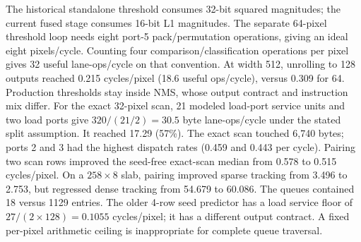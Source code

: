 The historical standalone threshold consumes 32-bit squared magnitudes; the current fused stage consumes 16-bit L1 magnitudes. The separate 64-pixel threshold loop needs eight port-5 pack/permutation operations, giving an ideal eight pixels/cycle. Counting four comparison/classification operations per pixel gives 32 useful lane-ops/cycle on that convention. At width 512, unrolling to 128 outputs reached 0.215 cycles/pixel (18.6 useful ops/cycle), versus 0.309 for 64. Production thresholds stay inside NMS, whose output contract and instruction mix differ.
For the exact 32-pixel scan, 21 modeled load-port service units and two load ports give $320/(21/2)=30.5$ byte lane-ops/cycle under the stated split assumption. It reached 17.29 (57\%). The exact scan touched 6,740 bytes; ports 2 and 3 had the highest dispatch rates (0.459 and 0.443 per cycle). Pairing two scan rows improved the seed-free exact-scan median from 0.578 to 0.515 cycles/pixel. On a $258\times8$ slab, pairing improved sparse tracking from 3.496 to 2.753, but regressed dense tracking from 54.679 to 60.086. The queues contained 18 versus 1129 entries. The older 4-row seed predictor has a load service floor of $27/(2\times128)=0.1055$ cycles/pixel; it has a different output contract. A fixed per-pixel arithmetic ceiling is inappropriate for complete queue traversal.
